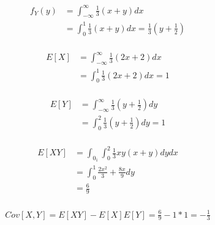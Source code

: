 \documentclass[paper=a4, fontsize=11pt]{article}
\numberwithin{equation}{section} %
\numberwithin{figure}{section} %
\numberwithin{table}{section} %
\begin{document}
\begin{align}
\begin{split}
    f_Y(y) &= \int_{-\infty}^{\infty} \frac{1}{3}(x + y)dx \\
    &= \int_{0}^{1} \frac{1}{3}(x + y)dx = \frac{1}{3}(y + \frac{1}{2})
\end{split}
\end{align}

\begin{align}
\begin{split}
    E[X] &= \int_{-\infty}^{\infty} \frac{1}{3}(2x + 2)dx \\
    &= \int_{0}^{1} \frac{1}{3}(2x + 2)dx = 1
\end{split}
\end{align}

\begin{align}
\begin{split}
    E[Y] &= \int_{-\infty}^{\infty} \frac{1}{3}(y + \frac{1}{2})dy \\
    &= \int_{0}^{2} \frac{1}{3}(y + \frac{1}{2})dy = 1
\end{split}
\end{align}

\begin{align}
\begin{split}
    E[XY] &= \int_{0}_{1}\int_{0}^{2} \frac{1}{3}xy(x + y)dydx\\
    &= \int_{0}^{1} \frac{2x^2}{3} + \frac{8x}{9} dy\\
    &= \frac{6}{9}
\end{split}
\end{align}

\begin{align}
\begin{split}
    Cov[X,Y] = E[XY] - E[X]E[Y] = \frac{6}{9} - 1 * 1 = -\frac{1}{3}
\end{split}
\end{align}
\end{document}
